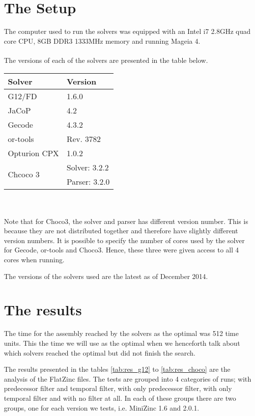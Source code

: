 \section{The Setup}
The computer used to run the solvers was equipped with an Intel i7 2.8GHz quad core CPU, 8GB DDR3 1333MHz memory and running Mageia 4.
\\\\
The versions of each of the solvers are presented in the table below.
\begin{table}[h]
\centering
\begin{tabular}{l|l}
Solver                    & Version \\ \hline
G12/FD                    & 1.6.0\\
JaCoP                     & 4.2 \\
Gecode                    & 4.3.2 \\
or-tools                  & Rev. 3782 \\
Opturion CPX              & 1.0.2 \\
\multirow{2}{*}{Chcoco 3} & Solver: 3.2.2 \\
                          & Parser: 3.2.0
\end{tabular}
\end{table}\\\\
Note that for Choco3, the solver and parser has different version number. This is because they are not distributed together and therefore have slightly different version numbers. It is possible to specify the number of cores used by the solver for Gecode, or-tools and Choco3. Hence, these three were given access to all 4 cores when running.

The versions of the solvers used are the latest as of December 2014.

\section{The results}\label{sec:res}
The time for the assembly reached by the solvers as the optimal was 512 time units. This the time we will use as the optimal when we henceforth talk about which solvers reached the optimal but did not finish the search.

The results presented in the tables \ref{tab:res_g12} to \ref{tab:res_choco} are the analysis of the FlatZinc files. The tests are grouped into 4 categories of runs; with predecessor filter and temporal filter, with only predecessor filter, with only temporal filter and with no filter at all. In each of these groups there are two groups, one for each version we tests, i.e. MiniZinc 1.6 and 2.0.1.

